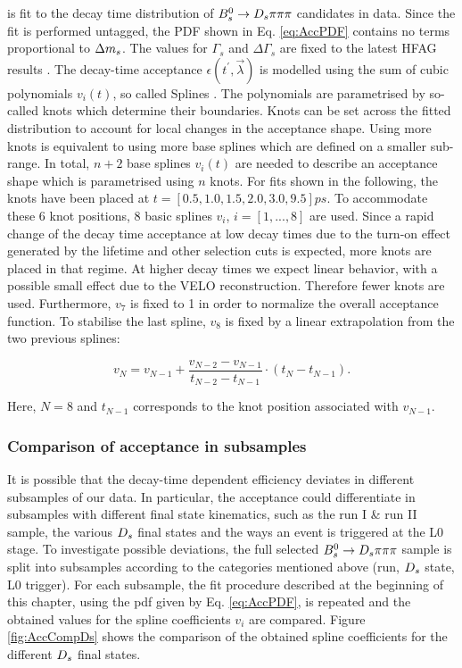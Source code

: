 is fit to the decay time distribution of ${{B}^0_{s}}\rightarrow{\ensuremath{{D}_{s}}}{\ensuremath{\pi}}{\ensuremath{\pi}}{\ensuremath{\pi}}$ candidates in data. 
Since the fit is performed untagged, the PDF shown in Eq. \ref{eq:AccPDF} contains no terms proportional to ${\Delta m_{{s}}}$. 
The values for $\Gamma_{s}$ and $\Delta\Gamma_{s}$ are fixed to the latest HFAG results \cite{HFAG}. 
The decay-time acceptance $\epsilon(t^{'}, \vec{\lambda})$ is modelled using the sum of cubic polynomials $v_{i}(t)$, so called Splines \cite{Karbach:2014qba}. 
The polynomials are parametrised by so-called knots which determine their boundaries. Knots can be set across the fitted distribution to account for local changes in the acceptance shape.
Using more knots is equivalent to using more base splines which are defined on a smaller sub-range. 
In total, $n+2$ base splines $v_{i}(t)$ are needed to describe an acceptance shape which is parametrised using $n$ knots.\newline
For fits shown in the following, the knots have been placed at $t = [0.5, 1.0, 1.5, 2.0, 3.0, 9.5] ps$. To accommodate these 6 knot positions, 8 basic splines $v_{i}$, $i = [1,...,8]$ are used.
Since a rapid change of the decay time acceptance at low decay times due to the turn-on effect generated by the lifetime and other selection cuts is expected, more knots are placed in that regime.
At higher decay times we expect linear behavior, with a possible small effect due to the VELO reconstruction. Therefore fewer knots are used. 
Furthermore, $v_{7}$ is fixed to 1 in order to normalize the overall acceptance function. To stabilise the last spline, $v_{8}$ is fixed by a linear extrapolation from the two previous splines:

\begin{equation}   
v_{N} = v_{N-1} + \frac{v_{N-2} - v_{N-1}}{t_{N-2} - t_{N-1}} \cdot (t_{N} - t_{N-1}).
\label{eq:SplineExtra}
\end{equation}

Here, $N=8$ and $t_{N-1}$ corresponds to the knot position associated with $v_{N-1}$. 

\clearpage

\subsubsection{Comparison of acceptance in subsamples}
\label{subsec: AccComparison}

It is possible that the decay-time dependent efficiency deviates in different subsamples of our data. 
In particular, the acceptance could differentiate in subsamples with different final state kinematics, such as the run I \& run II sample, the various ${{D}_{s}}$ final states and the ways an event is triggered at the L0 stage.
To investigate possible deviations, the full selected ${{B}^0_{s}}\rightarrow{\ensuremath{{D}_{s}}}{\ensuremath{\pi}}{\ensuremath{\pi}}{\ensuremath{\pi}}$ sample is split into subsamples according to the categories mentioned above (run, ${{D}_{s}}$ state, L0 trigger). 
For each subsample, the fit procedure described at the beginning of this chapter, using the pdf given by Eq. \ref{eq:AccPDF}, is repeated and the obtained values for the spline coefficients  $v_{i}$ are compared.
Figure \ref{fig:AccCompDs} shows the comparison of the obtained spline coefficients for the different ${{D}_{s}}$ final states.

